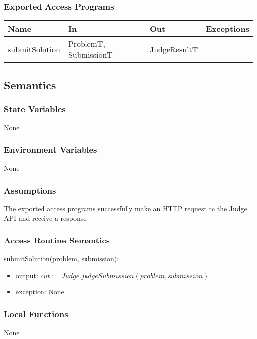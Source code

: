 \documentclass[12pt, titlepage]{article}
\begin{document}
\subsubsection{Exported Access Programs}

\begin{center}
\begin{tabular}{p{4cm} p{4cm} p{4cm} p{2cm}}
\hline
\textbf{Name} & \textbf{In} & \textbf{Out} & \textbf{Exceptions} \\
\hline
submitSolution & ProblemT, SubmissionT & JudgeResultT & \\
\hline
\end{tabular}
\end{center}

\subsection{Semantics}

\subsubsection{State Variables}

None

\subsubsection{Environment Variables}

None

\subsubsection{Assumptions}

The exported access programs successfully make an HTTP request to the Judge API and receive a response.

\subsubsection{Access Routine Semantics}

\noindent submitSolution(problem, submission):
\begin{itemize}
\item output: $out := Judge.judgeSubmission(problem, submission)$
\item exception: None
\end{itemize}

\subsubsection{Local Functions}
None
\end{document}
